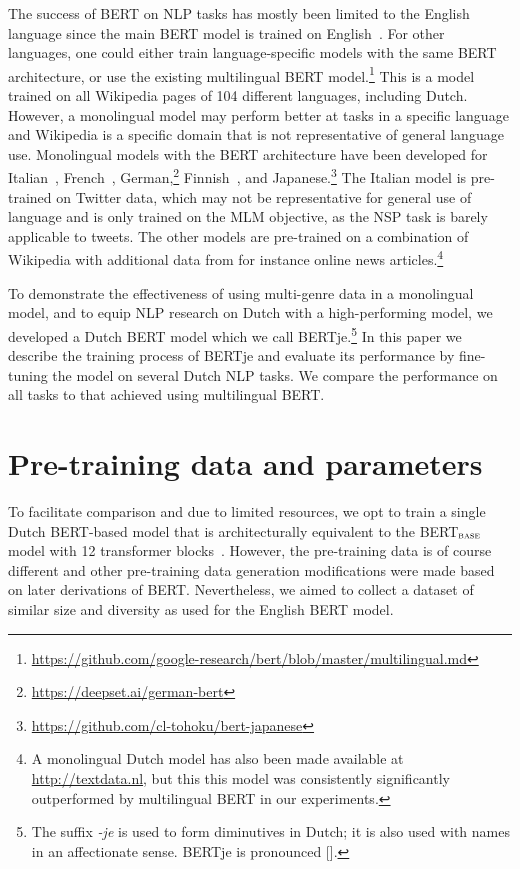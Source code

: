 \documentclass[11pt]{article}
\begin{document}
The success of BERT on NLP tasks has mostly been limited to the English language since the main BERT model is trained on English~\citep{devlin2019bert}.
For other languages, one could either train language-specific models with the same BERT architecture, or use the existing multilingual BERT model.\footnote{\url{https://github.com/google-research/bert/blob/master/multilingual.md}}
This is a model trained on all Wikipedia pages of 104 different languages, including Dutch.
However, a monolingual model may perform better at tasks in a specific language and Wikipedia is a specific domain that is not representative of general language use.
Monolingual models with the BERT architecture have been developed for Italian~\citep{polignano2019alberto},
French~\citep{le2019flaubert},
German,\footnote{\url{https://deepset.ai/german-bert}}
Finnish~\citep{virtanen2019multilingual},
and Japanese.\footnote{\url{https://github.com/cl-tohoku/bert-japanese}}
The Italian model is pre-trained on Twitter data, which may not be representative for general use of language and is only trained on the MLM objective, as the NSP task is barely applicable to tweets.
The other models are pre-trained on a combination of Wikipedia with additional data from for instance online news articles.\footnote{A monolingual Dutch model has also been made available at \url{http://textdata.nl}, but this this model was consistently significantly outperformed by multilingual BERT in our experiments.}

To demonstrate the effectiveness of using multi-genre data in a monolingual model, and to equip NLP research on Dutch with a high-performing model, we developed a Dutch BERT model which we call BERTje.\footnote{The suffix \emph{-je} is used to form diminutives in Dutch; it is also used with names in an affectionate sense. BERTje is pronounced  [].} In this paper we describe the training process of BERTje and evaluate its performance by fine-tuning the model on several Dutch NLP tasks.
We compare the performance on all tasks to that achieved using multilingual BERT.

\section{Pre-training data and parameters}
To facilitate comparison and due to limited resources,
we opt to train a single Dutch BERT-based model
that is architecturally equivalent to the BERT$_\textsc{base}$ model with 12 transformer blocks~\citep{devlin2019bert}.
However, the pre-training data is of course different
and other pre-training data generation modifications were made based on later derivations of BERT.
Nevertheless, we aimed to collect a dataset of similar size and diversity as used for the English BERT model.
\end{document}
